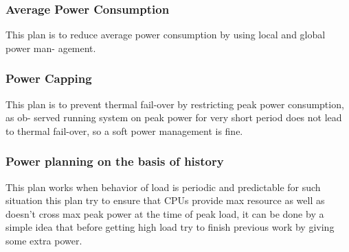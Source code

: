 \documentclass[seminar,twoside]{iitbreport}
\begin{document}
\subsubsection{Average Power Consumption}
This plan is to reduce average power consumption by using local and global power man-
agement.
\subsubsection{Power Capping}
This plan is to prevent thermal fail-over by restricting peak power consumption, as ob-
served running system on peak power for very short period does not lead to thermal fail-over, so a soft power management is fine.
\subsubsection{Power planning on the basis of history}
This plan works when behavior of load is periodic and predictable for such situation this plan try to ensure that CPUs
provide max resource as well as doesn't cross max peak power at the time of peak load, it can be done by a simple idea that 
before getting high load try to finish previous work by giving some extra power.
\end{document}
